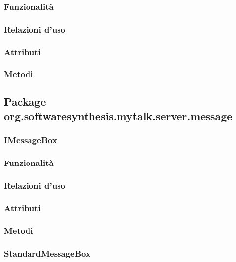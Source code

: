 \subsubsection*{Funzionalità}

\subsubsection*{Relazioni d'uso}

\subsubsection*{Attributi}

\subsubsection*{Metodi}

\subsection{Package org.softwaresynthesis.mytalk.server.message}\label{sec:message}

\subsubsection{IMessageBox}\label{sec:imessagebox}

\subsubsection*{Funzionalità}

\subsubsection*{Relazioni d'uso}

\subsubsection*{Attributi}

\subsubsection*{Metodi}

\subsubsection{StandardMessageBox}\label{sec:standardmessagebox}

